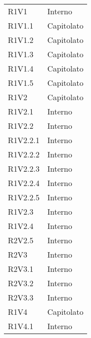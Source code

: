 \begin{longtable} {
			>{\centering}p{28mm}  
			>{}p{20mm}
		}
		R1V1 & Interno \TBstrut \\ [2mm]
		R1V1.1 & Capitolato \TBstrut \\ [2mm]
		R1V1.2 & Capitolato \TBstrut \\ [2mm]
		R1V1.3 & Capitolato \TBstrut \\ [2mm]
		R1V1.4 & Capitolato \TBstrut \\ [2mm]
		R1V1.5 & Capitolato \TBstrut \\ [2mm]
		R1V2 & Capitolato \TBstrut \\ [2mm]
		R1V2.1 & Interno \TBstrut \\ [2mm]
		R1V2.2 & Interno \TBstrut \\ [2mm]
		R1V2.2.1 & Interno \TBstrut \\ [2mm]
		R1V2.2.2 & Interno \TBstrut \\ [2mm]
		R1V2.2.3 & Interno \TBstrut \\ [2mm]
		R1V2.2.4 & Interno \TBstrut \\ [2mm]
		R1V2.2.5 & Interno \TBstrut \\ [2mm]
		R1V2.3 & Interno \TBstrut \\ [2mm]
		R1V2.4 & Interno \TBstrut \\ [2mm]
		R2V2.5 & Interno \TBstrut \\ [2mm]
		R2V3 & Interno \TBstrut \\ [2mm]
		R2V3.1 & Interno  \TBstrut \\ [2mm]		
		R2V3.2 & Interno  \TBstrut \\ [2mm]		
		R2V3.3 & Interno  \TBstrut \\ [2mm]		
		R1V4 & Capitolato  \TBstrut \\ [2mm]		
		R1V4.1 & Interno  \TBstrut \\ [2mm]
	\end{longtable}
